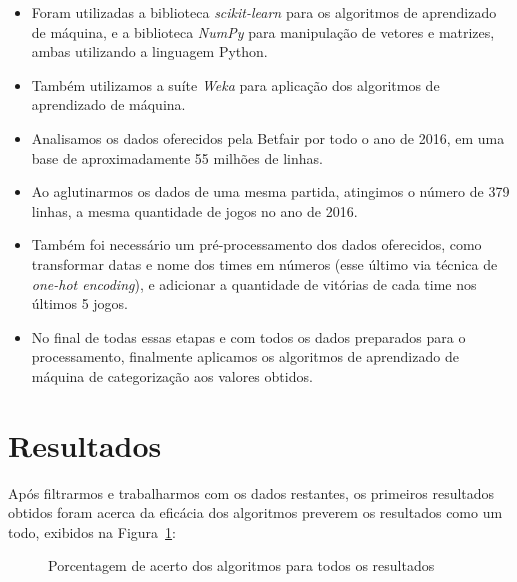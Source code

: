 \documentclass[thesis]{hmcposter}
\begin{document}
\begin{poster}
\begin{itemize}
\item Foram utilizadas a biblioteca \emph{scikit-learn} para os algoritmos de aprendizado de máquina, e a biblioteca \emph{NumPy} para manipulação de vetores e matrizes, ambas utilizando a linguagem Python.
\item Também utilizamos a suíte \emph{Weka} para aplicação dos algoritmos de aprendizado de máquina.
\item Analisamos os dados oferecidos pela Betfair por todo o ano de 2016, em uma base de aproximadamente 55 milhões de linhas.
\item Ao aglutinarmos os dados de uma mesma partida, atingimos o número de 379 linhas, a mesma quantidade de jogos no ano de 2016.
\item Também foi necessário um pré-processamento dos dados oferecidos, como transformar datas e nome dos times em números (esse último via técnica de \emph{one-hot encoding}), e adicionar a quantidade de vitórias de cada time nos últimos 5 jogos.
\item No final de todas essas etapas e com todos os dados preparados para o processamento, finalmente aplicamos os algoritmos de aprendizado de máquina de categorização aos valores obtidos.
\end{itemize}

\section{Resultados}%

Após filtrarmos e trabalharmos com os dados restantes, os primeiros resultados obtidos foram acerca da eficácia dos algoritmos preverem os resultados como um todo, exibidos na Figura~\ref{fig:algoritmo-total}:

\begin{figure}
\begin{center}
\caption{Porcentagem de acerto dos algoritmos para todos os resultados}%
\label{fig:algoritmo-total}
\end{center}
\end{figure}


\end{poster}
\end{document}
